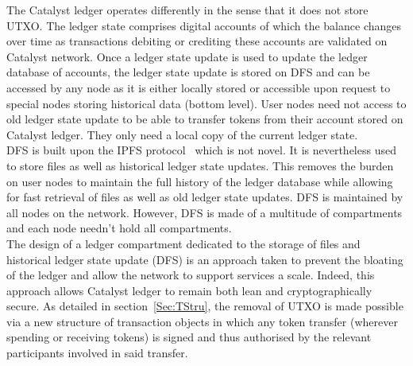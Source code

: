 The Catalyst ledger operates differently in the sense that it does not store UTXO. The ledger state comprises digital accounts of which the balance changes over time as transactions debiting or crediting these accounts are validated on Catalyst network. Once a ledger state update is used to update the ledger database of accounts, the ledger state update is stored on DFS and can be accessed by any node as it is either locally stored or accessible upon request to special nodes storing historical data (bottom level). User nodes need not access to old ledger state update to be able to transfer tokens from their account stored on Catalyst ledger. They only need  a local copy of the current ledger state.\\

DFS is built upon the IPFS protocol~\cite{ipfs} which is not novel. It is nevertheless used to store files as well as historical ledger state updates. This removes the burden on user nodes to maintain the full history of the ledger database while allowing for fast retrieval of files as well as old ledger state updates. DFS is maintained by all nodes on the network. However, DFS is made of a multitude of compartments and each node needn’t hold all compartments.\\

The design of a ledger compartment dedicated to the storage of files and historical ledger state update (DFS) is an approach taken to prevent the bloating of the ledger and allow the network to support services a scale. Indeed, this approach allows Catalyst ledger to remain both lean and cryptographically secure. As detailed in section~\ref{Sec:TStru}, the removal of UTXO is made possible via a new structure of transaction objects in which any token transfer (wherever spending or receiving tokens) is signed and thus authorised by the relevant participants involved in said transfer.
